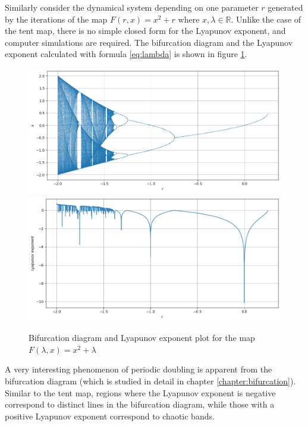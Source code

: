 \begin{exmp}
	Similarly consider the dynamical system depending on one parameter $r$ generated by the iterations of the map
    $F(r,x)=x^2+r$ where $x,\lambda \in \mathbb{R}$.
	Unlike the case of the tent map, there is no simple closed form for the Lyapunov exponent, and computer simulations are required. 
	The bifurcation diagram and the Lyapunov exponent calculated with formula \eqref{eq:lambda} is shown in figure \ref{fig:lyapunov_x^2}.
    \begin{figure}
        \centering
        \includegraphics[width=1\linewidth]{Bifurcation Images/bifurcation_quadratic.png}
        \includegraphics[width=1\linewidth]{Bifurcation Images/lypaunov_quadratic.png}
        \caption{Bifurcation diagram and Lyapunov exponent plot for the map $F(\lambda,x)=x^2+\lambda$}
        \label{fig:lyapunov_x^2}
    \end{figure}
	A very interesting phenomenon of periodic doubling is apparent from the bifurcation diagram (which is studied in detail in chapter \ref{chapter:bifurcation}).
	Similar to the tent map, regions where the Lyapunov exponent is negative correspond to distinct lines in the bifurcation diagram, while those with a positive Lyapunov exponent correspond to chaotic bands.
\end{exmp}




